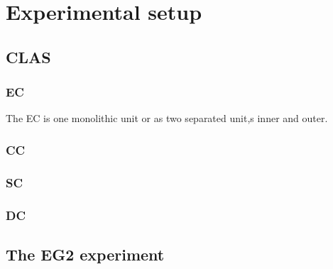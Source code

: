 \chapter{Experimental setup}

\section{CLAS}

\subsection{EC}

The EC is one monolithic unit or as two separated unit,s inner and outer.



\subsection{CC}

\subsection{SC}

\subsection{DC}

\section{The EG2 experiment}

